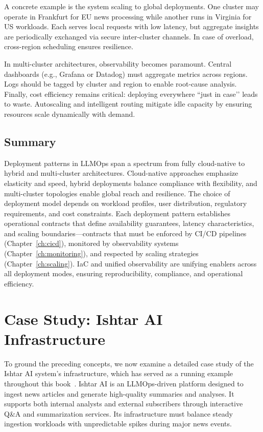 A concrete example is the \ishtar{} system scaling to global deployments. 
One cluster may operate in Frankfurt for EU news processing while another runs in Virginia for US workloads. 
Each serves local requests with low latency, but aggregate insights are periodically exchanged via secure inter-cluster channels. 
In case of overload, cross-region scheduling ensures resilience. 

In multi-cluster architectures, observability becomes paramount. 
Central dashboards (e.g., Grafana or Datadog) must aggregate metrics across regions. 
Logs should be tagged by cluster and region to enable root-cause analysis. 
Finally, cost efficiency remains critical: deploying everywhere ``just in case’’ leads to waste. 
Autoscaling and intelligent routing mitigate idle capacity by ensuring resources scale dynamically with demand. 

\subsection{Summary}\label{sec:deploy-summary}

Deployment patterns in LLMOps span a spectrum from fully cloud-native to hybrid and multi-cluster architectures. 
Cloud-native approaches emphasize elasticity and speed, hybrid deployments balance compliance with flexibility, and multi-cluster topologies enable global reach and resilience. 
The choice of deployment model depends on workload profiles, user distribution, regulatory requirements, and cost constraints. Each deployment pattern establishes operational contracts that define availability guarantees, latency characteristics, and scaling boundaries—contracts that must be enforced by CI/CD pipelines (Chapter~\ref{ch:cicd}), monitored by observability systems (Chapter~\ref{ch:monitoring}), and respected by scaling strategies (Chapter~\ref{ch:scaling}). IaC and unified observability are unifying enablers across all deployment modes, ensuring reproducibility, compliance, and operational efficiency.


\section{Case Study: Ishtar AI Infrastructure}
\label{sec:ishtar-case}

To ground the preceding concepts, we now examine a detailed case study of the Ishtar AI system’s infrastructure, which has served as a running example throughout this book~\cite{srivatsa2024-iac-llm}. Ishtar AI is an LLMOps-driven platform designed to ingest news articles and generate high-quality summaries and analyses. It supports both internal analysts and external subscribers through interactive Q\&A and summarization services. Its infrastructure must balance steady ingestion workloads with unpredictable spikes during major news events.


